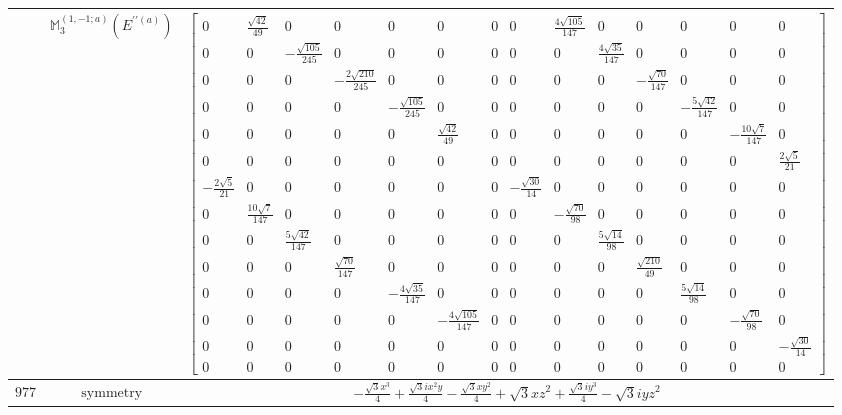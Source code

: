 \documentclass[fleqn,8pt,landscape]{jsarticle}
\begin{document}
\begin{longtable}{ccc}
$  $ & $ \mathbb{M}_{3}^{(1,-1;a)}(E^{\prime\prime(a)}) $ & $ \begin{bmatrix} 0 & \frac{\sqrt{42}}{49} & 0 & 0 & 0 & 0 & 0 & 0 & \frac{4 \sqrt{105}}{147} & 0 & 0 & 0 & 0 & 0 \\ 0 & 0 & - \frac{\sqrt{105}}{245} & 0 & 0 & 0 & 0 & 0 & 0 & \frac{4 \sqrt{35}}{147} & 0 & 0 & 0 & 0 \\ 0 & 0 & 0 & - \frac{2 \sqrt{210}}{245} & 0 & 0 & 0 & 0 & 0 & 0 & - \frac{\sqrt{70}}{147} & 0 & 0 & 0 \\ 0 & 0 & 0 & 0 & - \frac{\sqrt{105}}{245} & 0 & 0 & 0 & 0 & 0 & 0 & - \frac{5 \sqrt{42}}{147} & 0 & 0 \\ 0 & 0 & 0 & 0 & 0 & \frac{\sqrt{42}}{49} & 0 & 0 & 0 & 0 & 0 & 0 & - \frac{10 \sqrt{7}}{147} & 0 \\ 0 & 0 & 0 & 0 & 0 & 0 & 0 & 0 & 0 & 0 & 0 & 0 & 0 & \frac{2 \sqrt{5}}{21} \\ - \frac{2 \sqrt{5}}{21} & 0 & 0 & 0 & 0 & 0 & 0 & - \frac{\sqrt{30}}{14} & 0 & 0 & 0 & 0 & 0 & 0 \\ 0 & \frac{10 \sqrt{7}}{147} & 0 & 0 & 0 & 0 & 0 & 0 & - \frac{\sqrt{70}}{98} & 0 & 0 & 0 & 0 & 0 \\ 0 & 0 & \frac{5 \sqrt{42}}{147} & 0 & 0 & 0 & 0 & 0 & 0 & \frac{5 \sqrt{14}}{98} & 0 & 0 & 0 & 0 \\ 0 & 0 & 0 & \frac{\sqrt{70}}{147} & 0 & 0 & 0 & 0 & 0 & 0 & \frac{\sqrt{210}}{49} & 0 & 0 & 0 \\ 0 & 0 & 0 & 0 & - \frac{4 \sqrt{35}}{147} & 0 & 0 & 0 & 0 & 0 & 0 & \frac{5 \sqrt{14}}{98} & 0 & 0 \\ 0 & 0 & 0 & 0 & 0 & - \frac{4 \sqrt{105}}{147} & 0 & 0 & 0 & 0 & 0 & 0 & - \frac{\sqrt{70}}{98} & 0 \\ 0 & 0 & 0 & 0 & 0 & 0 & 0 & 0 & 0 & 0 & 0 & 0 & 0 & - \frac{\sqrt{30}}{14} \\ 0 & 0 & 0 & 0 & 0 & 0 & 0 & 0 & 0 & 0 & 0 & 0 & 0 & 0 \end{bmatrix} $ \\ \hline
$ 977 $ & $ \text{symmetry} $ & $ - \frac{\sqrt{3} x^{3}}{4} + \frac{\sqrt{3} i x^{2} y}{4} - \frac{\sqrt{3} x y^{2}}{4} + \sqrt{3} x z^{2} + \frac{\sqrt{3} i y^{3}}{4} - \sqrt{3} i y z^{2} $ \\

\end{longtable}
\end{document}
